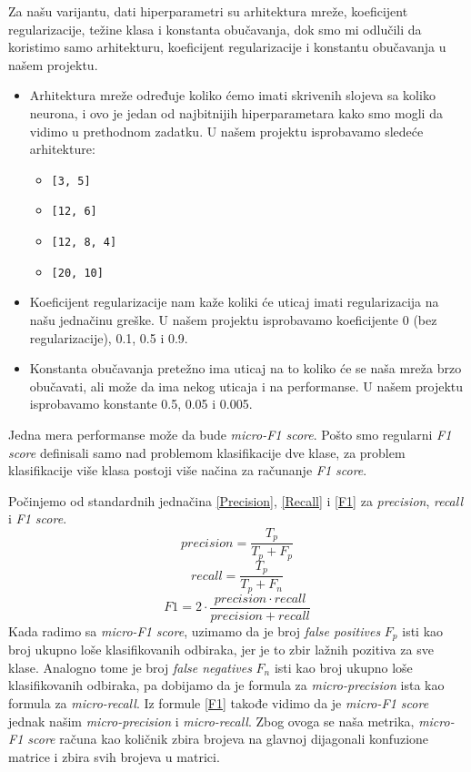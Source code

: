 \documentclass[10pt,a4paper,titlepage,croatian]{article}
\begin{document}
Za našu varijantu, dati hiperparametri su arhitektura mreže, koeficijent regularizacije, težine klasa i
konstanta obučavanja, dok smo mi odlučili da koristimo samo arhitekturu, koeficijent regularizacije i konstantu obučavanja u našem projektu.
\begin{itemize}
    \item Arhitektura mreže određuje koliko ćemo imati skrivenih slojeva sa koliko neurona, i ovo je jedan od najbitnijih hiperparametara kako smo mogli da vidimo u prethodnom zadatku. U našem projektu isprobavamo sledeće arhitekture:
    \begin{itemize}
        \item \texttt{[3, 5]}
        \item \texttt{[12, 6]}
        \item \texttt{[12, 8, 4]}
        \item \texttt{[20, 10]}
    \end{itemize}
    \item Koeficijent regularizacije nam kaže koliki će uticaj imati regularizacija na našu jednačinu greške. U našem projektu isprobavamo koeficijente 0 (bez regularizacije), 0.1, 0.5 i 0.9.
    \item Konstanta obučavanja pretežno ima uticaj na to koliko će se naša mreža brzo obučavati, ali može da ima nekog uticaja i na performanse. U našem projektu isprobavamo konstante 0.5, 0.05 i 0.005.
\end{itemize}

Jedna mera performanse može da bude \textit{micro-F1 score}. Pošto smo regularni \textit{F1 score} definisali samo nad problemom klasifikacije dve klase, za problem klasifikacije više klasa postoji više načina za računanje \textit{F1 score}.

Počinjemo od standardnih jednačina \eqref{Precision}, \eqref{Recall} i \eqref{F1} za \textit{precision}, \textit{recall} i \textit{F1 score}.
\begin{equation}
    precision = \frac{T_p}{T_p + F_p}
    \label{Precision}
\end{equation}
\begin{equation}
    recall = \frac{T_p}{T_p + F_n}
    \label{Recall}
\end{equation}
\begin{equation}
    F1 = 2 \cdot \frac{precision \cdot recall}{precision + recall}
    \label{F1}
\end{equation}
Kada radimo sa \textit{micro-F1 score}, uzimamo da je broj \textit{false positives} $F_p$ isti kao broj ukupno loše klasifikovanih odbiraka, jer je to zbir lažnih pozitiva za sve klase. Analogno tome je broj \textit{false negatives} $F_n$ isti kao broj ukupno loše klasifikovanih odbiraka, pa dobijamo da je formula za \textit{micro-precision} ista kao formula za \textit{micro-recall}. Iz formule \eqref{F1} takođe vidimo da je \textit{micro-F1 score} jednak našim \textit{micro-precision} i \textit{micro-recall}. Zbog ovoga se naša metrika, \textit{micro-F1 score} računa kao količnik zbira brojeva na glavnoj dijagonali konfuzione matrice i zbira svih brojeva u matrici.
\end{document}

